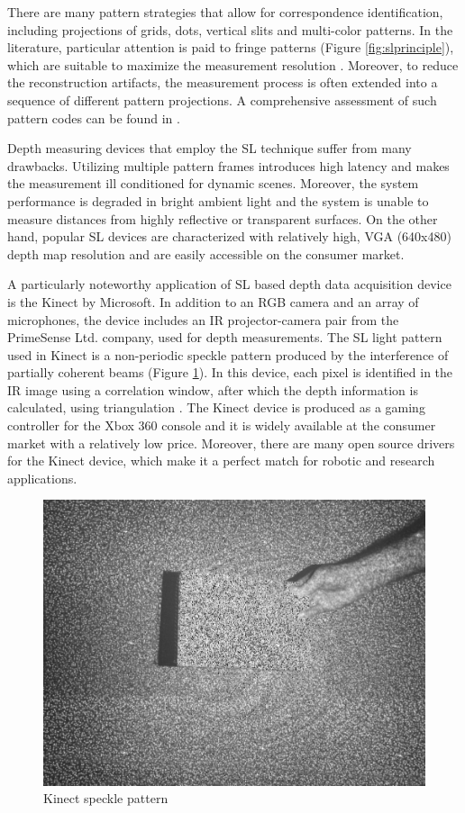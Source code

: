 	There are many pattern strategies that allow for correspondence identification, including projections of grids, dots, vertical slits and multi-color patterns. In the literature, particular attention is paid to fringe patterns (Figure \ref{fig:slprinciple}), which are suitable to maximize the measurement resolution \cite{sensors}. Moreover, to reduce the reconstruction artifacts, the measurement process is often extended into a sequence of different pattern projections. A comprehensive assessment of such pattern codes can be found in \cite{slcodes}.
	
	Depth measuring devices that employ the SL technique suffer from many drawbacks. Utilizing multiple pattern frames introduces high latency and makes the measurement ill conditioned for dynamic scenes. Moreover, the system performance is degraded in bright ambient light and the system is unable to measure distances from highly reflective or transparent surfaces. On the other hand, popular SL devices are characterized with relatively high, VGA (640x480) depth map resolution and are easily accessible on the consumer market.


	A particularly noteworthy application of SL based depth data acquisition device is the Kinect by Microsoft. In addition to an RGB camera and an array of microphones, the device includes an IR projector-camera pair from the PrimeSense Ltd. company, used for depth measurements. The SL light pattern used in Kinect is a non-periodic speckle pattern produced by the interference of partially coherent beams (Figure \ref{fig:kinectspeckle}). In this device, each pixel is identified in the IR image using a correlation window, after which the depth information is calculated, using triangulation \cite{borenstein2012making}. The Kinect device is produced as a gaming controller for the Xbox 360 console and it is widely available at the consumer market with a relatively low price. Moreover, there are many open source drivers for the Kinect device, which make it a perfect match for robotic and research applications.
	
\begin{figure}[H]
\centering
\includegraphics[scale=0.25]{fig/KinectSpeckle}
\caption{Kinect speckle pattern \cite{borenstein2012making}}
\label{fig:kinectspeckle}
\end{figure}
	


